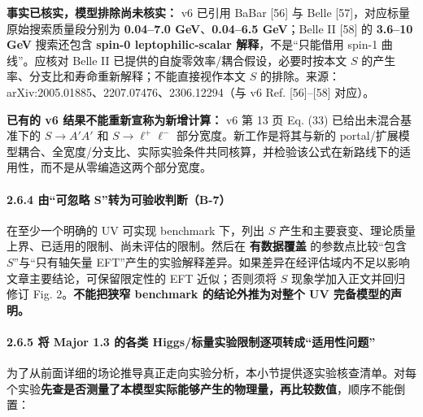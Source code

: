 \documentclass[
  chinese,
  UTF8]{ctexart}
\begin{document}
\textbf{事实已核实，模型排除尚未核实：} v6 已引用 BaBar {[}56{]} 与
Belle {[}57{]}，对应标量原始搜索质量段分别为 \textbf{0.04--7.0
GeV}、\textbf{0.04--6.5 GeV}；Belle II {[}58{]} 的 \textbf{3.6--10 GeV}
搜索还包含 \textbf{spin-0 leptophilic-scalar 解释}，不是``只能借用
spin-1 曲线''。应核对 Belle II 已提供的自旋零效率/耦合假设，必要时按本文
\(S\) 的产生率、分支比和寿命重新解释；不能直接视作本文 \(S\)
的排除。来源：arXiv:2005.01885、2207.07476、2306.12294（与 v6 Ref.
{[}56{]}--{[}58{]} 对应）。

\textbf{已有的 v6 结果不能重新宣称为新增计算：} v6 第 13 页 Eq. (33)
已给出未混合基准下的 \(S\to A'A'\) 和 \(S\to\ell^+\ell^-\)
部分宽度。新工作是将其与新的
portal/扩展模型耦合、全宽度/分支比、实际实验条件共同核算，并检验该公式在新路线下的适用性，而不是从零编造这两个部分宽度。

\paragraph{2.6.4 由``可忽略
S''转为可验收判断（B-7）}\label{ux7531ux53efux5ffdux7565-sux8f6cux4e3aux53efux9a8cux6536ux5224ux65adb-7}

在至少一个明确的 UV 可实现 benchmark 下，列出 \(S\)
产生和主要衰变、理论质量上界、已适用的限制、尚未评估的限制。然后在
\textbf{有数据覆盖} 的参数点比较``包含 \(S\)''与``只有轴矢量
EFT''产生的实验解释差异。如果差异在经评估域内不足以影响文章主要结论，可保留限定性的
EFT 近似；否则须将 \(S\) 现象学加入正文并回归修订 Fig.
2。\textbf{不能把狭窄 benchmark 的结论外推为对整个 UV 完备模型的声明。}

\paragraph{2.6.5 将 Major 1.3 的各类
Higgs/标量实验限制逐项转成``适用性问题''}\label{ux5c06-major-1.3-ux7684ux5404ux7c7b-higgsux6807ux91cfux5b9eux9a8cux9650ux5236ux9010ux9879ux8f6cux6210ux9002ux7528ux6027ux95eeux9898}

为了从前面详细的场论推导真正走向实验分析，本小节提供逐实验核查清单。对每个实验\textbf{先查是否测量了本模型实际能够产生的物理量，再比较数值}，顺序不能倒置：
\end{document}
